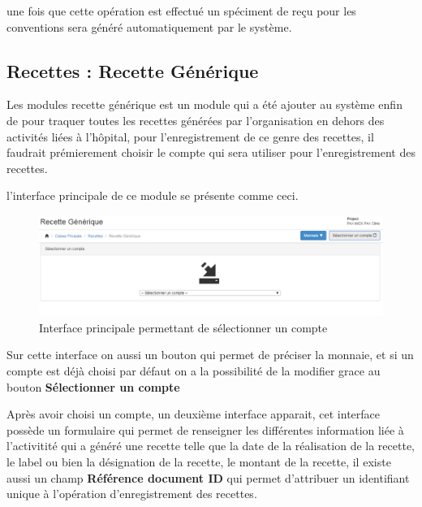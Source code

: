 \documentclass[12pt,a4paper]{report}
\begin{document}
une fois que cette opération est effectué un spéciment de reçu pour les conventions sera généré automatiquement par le système.


\newpage
\subsection{Recettes : Recette Générique}
Les modules recette générique est un module qui a été ajouter au système enfin de pour traquer toutes les recettes générées par l'organisation en dehors des activités liées à l'hôpital, pour l'enregistrement de ce genre des recettes, il faudrait prémierement choisir le compte qui sera utiliser pour l'enregistrement des recettes.

l'interface principale de ce module se présente comme ceci.

\begin{figure}[h]
\begin{center}
\includegraphics[width=14cm]{pic/recetteGen.png}
\end{center}
\caption{Interface principale permettant de sélectionner un compte}
\label{Interface principale permettant de sélectionner un compte}
\end{figure}

Sur cette interface on aussi un bouton qui permet de préciser la monnaie, et si un compte est déjà choisi par défaut on a la possibilité de la modifier grace au bouton \textbf{Sélectionner un compte}

Après avoir choisi un compte, un deuxième interface apparait, cet interface possède un formulaire qui permet de renseigner les différentes information liée à l'activitité qui a généré une recette telle que la date de la réalisation de la recette, le label ou bien la désignation de la recette, le montant de la recette, il existe aussi un champ \textbf{Référence document ID} qui permet d'attribuer un identifiant unique à l'opération d'enregistrement des recettes.
\end{document}
